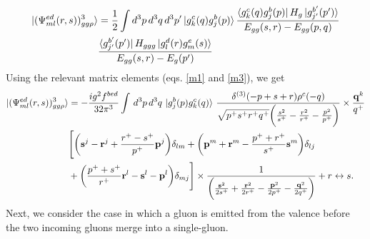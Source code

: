 \documentclass[a4paper,11pt]{article}
\def\v#1{\mathbf{#1}}
\begin{document}
\begin{figure}[htbp]
    \centering
\end{figure}
\begin{align}
     \ket{(\Psi^{ed}_{ml}(r,s))^{3}_{gg\rho}} & = \frac{1}{2} \int d^{3}p\, d^{3}q\, d^{3}p^{\prime}\ket{g^{c}_{k}(q)g^{b}_{j}(p)}\frac{\bra{g^{c}_{k}(q)g^{b}_{j}(p)}H_{g}\ket{g^{b^{\prime}}_{j^{\prime}}(p^{\prime})}}{E_{gg}(s,r)-E_{gg}(p,q)}\notag \\ & \frac{\bra{g^{b^{\prime}}_{j^{\prime}}(p^{\prime})}H_{ggg}\ket{g^{d}_{l}(r)g^{e}_{m}(s)}}{E_{gg}(s,r)-E_{g}(p^{\prime})}
\end{align}
Using the relevant matrix elements (eqs. \eqref{m1} and \eqref{m3}), we get
\begin{align}
    \ket{(\Psi^{ed}_{ml}(r,s))^{3}_{gg\rho}} & = -\frac{ig^{2}f^{bed}}{32\pi^{3}}\int\, d^{3}p\, d^{3}q\, \ket{g^{b}_{j}(p)g^{c}_{k}(q)}\, \frac{\delta^{(3)}(-p+s+r)\rho^{c}(-q)}{\sqrt{p^{+}s^{+}r^{+}q^{+}}\bigg(\frac{s^{2}}{s^{+}}-\frac{r^{2}}{r^{+}}-\frac{p^{2}}{p^{+}}\bigg)}\times \frac{\v{q}^{k}}{q^{+}}\notag \\ & \Bigg[\bigg(\v{s}^{j}-\v{r}^{j}+\frac{r^{+}-s^{+}}{p^{+}}\v{p}^{j}\bigg)\delta_{lm} +\bigg(\v{p}^{m}+\v{r}^{m}-\frac{p^{+}+r^{+}}{s^{+}}\v{s}^{m}\bigg)\delta_{lj}\notag \\ & +\bigg(\frac{p^{+}+s^{+}}{r^{+}}\v{r}^{l}-\v{s}^{l}-\v{p}^{l}\bigg)\delta_{mj}\Bigg] \times \frac{1}{\bigg(\frac{\v{s}^{2}}{2s^{+}}+\frac{\v{r}^{2}}{2r^{+}}-\frac{\v{p}^{2}}{2p^{+}}-\frac{\v{q}^{2}}{2q^{+}}\bigg)} + r\leftrightarrow s.
\end{align}
Next, we consider the case in which a gluon is emitted from the valence before the two incoming gluons merge into a single-gluon. 
\end{document}

